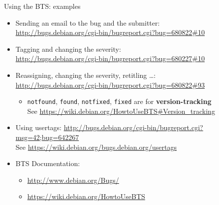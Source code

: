 \documentclass[10pt,final]{beamer}
\begin{document}
\begin{frame}{Using the BTS: examples}
\begin{itemize}
\item Sending an email to the bug and the submitter:\\
	\url{http://bugs.debian.org/cgi-bin/bugreport.cgi?bug=680822\#10}
\hbr
\item Tagging and changing the severity:\\
	\url{http://bugs.debian.org/cgi-bin/bugreport.cgi?bug=680227\#10}
\hbr
\item Reassigning, changing the severity, retitling \ldots: \\
	\url{http://bugs.debian.org/cgi-bin/bugreport.cgi?bug=680822\#93}
\begin{itemize}
	\item \texttt{notfound}, \texttt{found}, \texttt{notfixed}, \texttt{fixed} are for \textbf{version-tracking} \\
	See \url{https://wiki.debian.org/HowtoUseBTS\#Version\_tracking}
\end{itemize}
\hbr
\item Using usertags: \url{http://bugs.debian.org/cgi-bin/bugreport.cgi?msg=42;bug=642267}\\
	See \url{https://wiki.debian.org/bugs.debian.org/usertags}
\hbr
\item BTS Documentation:
\begin{itemize}
\item \url{http://www.debian.org/Bugs/}
\item \url{https://wiki.debian.org/HowtoUseBTS}
\end{itemize}
\end{itemize}
\end{frame}
\end{document}
